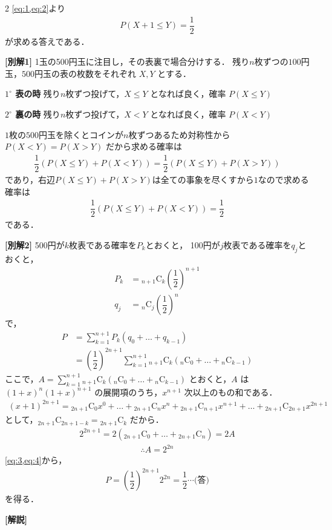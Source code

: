 \documentclass[../../main.tex]{subfiles}
\begin{document}
\begin{multicols}{2}
  \cref{eq:1,eq:2}より
  \begin{align}
    P(X+1 \le Y) = \dfrac{1}{2}
  \end{align}
  が求める答えである．

  {\bf [別解1]}
  1玉の500円玉に注目し，その表裏で場合分けする．
  残り$n$枚ずつの$100$円玉，$500$円玉の表の枚数をそれぞれ $X, Y$ とする．

  \textbf{$1^\circ$ 表の時}
  残り$n$枚ずつ投げて，$X \le Y$ となれば良く，確率 $P(X \le Y)$

  \textbf{$2^\circ$ 裏の時}
  残り$n$枚ずつ投げて，$X < Y$ となれば良く，確率 $P(X < Y)$

  $1$枚の$500$円玉を除くとコインが$n$枚ずつあるため対称性から $P(X < Y) = P(X > Y)$ だから求める確率は
  \begin{align}
    \dfrac{1}{2} \left( P(X \le Y) + P(X < Y) \right) = \dfrac{1}{2} \left( P(X \le Y) + P(X > Y) \right)
  \end{align}
  であり，右辺$P(X \le Y) + P(X > Y)$は全ての事象を尽くすから$1$なので求める確率は
  \begin{align}
    \dfrac{1}{2} \left( P(X \le Y) + P(X < Y) \right) = \dfrac{1}{2}
  \end{align}
  である．

  {\bf [別解2]}
  500円が$k$枚表である確率を$P_k$とおくと，
  100円が$j$枚表である確率を$q_j$とおくと，
  \begin{align}
    P_k & = {}_{n+1}\mathrm{C}_k \left(\dfrac{1}{2}\right)^{n+1} \\
    q_j & = {}_{n}\mathrm{C}_j \left(\dfrac{1}{2}\right)^{n}
  \end{align}
  で，
  \begin{align}
    P & = \sum_{k=1}^{n+1} P_k (q_0 + \dots + q_{k-1})                                                                                                 \\
    & = \left(\dfrac{1}{2}\right)^{2n+1} \sum_{k=1}^{n+1} {}_{n+1}\mathrm{C}_k ({}_n\mathrm{C}_0 + \dots + {}_n\mathrm{C}_{k-1}) \label{eq:3}
  \end{align}
  ここで，$A = \sum_{k=1}^{n+1} {}_{n+1}\mathrm{C}_k ({}_n\mathrm{C}_0 + \dots + {}_n\mathrm{C}_{k-1})$ とおくと，$A$ は $(1+x)^n (1+x)^{n+1}$ の展開項のうち，$x^{n+1}$ 次以上のもの和である．
  \begin{align}
    (x+1)^{2n+1} = {}_{2n+1}\mathrm{C}_0 x^0 + \dots + {}_{2n+1}\mathrm{C}_n x^n + {}_{2n+1}\mathrm{C}_{n+1} x^{n+1} + \dots + {}_{2n+1}\mathrm{C}_{2n+1} x^{2n+1}
  \end{align}
  として，${}_{2n+1}\mathrm{C}_{2n+1-k} = {}_{2n+1}\mathrm{C}_k$ だから．
  \begin{align}
    2^{2n+1} = 2 \left( {}_{2n+1}\mathrm{C}_0 + \dots + {}_{2n+1}\mathrm{C}_n \right) = 2A
  \end{align}
  \begin{align}
    \therefore A = 2^{2n} \label{eq:4}
  \end{align}
  \cref{eq:3,eq:4}から，
  \begin{align}
    P = \left(\dfrac{1}{2}\right)^{2n+1} 2^{2n} = \dfrac{1}{2} \cdots\text{(答)}
  \end{align}
  を得る．

  {\bf [解説]}

  \newpage
\end{multicols}
\end{document}
